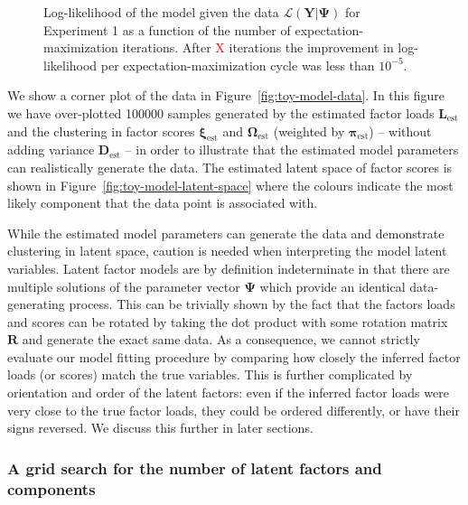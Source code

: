 \documentclass[twocolumn]{aastex61}
\newcommand{\todo}[1]{\textcolor{red}{#1}}
\newcommand{\vect}[1]{\boldsymbol{\mathbf{#1}}}
\renewcommand{\vec}[1]{\vect{#1}}
\newcommand{\weight}{\pi}
\newcommand{\data}{\textbf{Y}}
\newcommand{\factorloads}{\textbf{L}}
\newcommand{\specificvariance}{\vec{D}}
\newcommand{\scoremeans}{\vec\xi}
\newcommand{\scorecovs}{\vec\Omega}
\begin{document}
\begin{figure}
    \caption{Log-likelihood of the model given the data $\mathcal{L}\left(\vec\data|\vec\Psi\right)$ for Experiment 1 as a function of the number of expectation-maximization iterations. After \todo{X} iterations the improvement in log-likelihood per
    expectation-maximization cycle was less than $10^{-5}$.}
    \label{fig:toy-log-likelihood-per-iteration}
\end{figure}


We show a corner plot of the data in Figure~\ref{fig:toy-model-data}.
In this figure we have over-plotted 100000 samples generated by the
estimated factor loads $\factorloads_\textrm{est}$ and the clustering in factor 
scores $\scoremeans_\textrm{est}$ and $\scorecovs_\textrm{est}$ (weighted by $\vec\weight_\textrm{est}$)
-- without adding variance $\specificvariance_\textrm{est}$ %
-- in order to illustrate that the
estimated model parameters can realistically generate the data.
The estimated latent space of factor scores is shown in 
Figure~\ref{fig:toy-model-latent-space} where the colours indicate the
most likely component that the data point is associated with.

While the estimated model parameters can generate the data and demonstrate
clustering in latent space, caution is needed when interpreting the 
model latent variables.
Latent factor models are by definition indeterminate in that there are
multiple solutions of the parameter vector $\vec\Psi$ which provide
an identical data-generating process. This can be trivially shown by
the fact that the factors loads and scores can be rotated by taking the
dot product
with some rotation
matrix $\textbf{R}$ and generate the exact same data. As a consequence,
we cannot strictly evaluate our model fitting procedure by comparing
how closely the inferred factor loads (or scores) match the true 
variables. This is further complicated by orientation and order
of the latent factors: even if the inferred factor loads were very close
to the true factor loads, they could be ordered differently, or have
their signs reversed. We discuss this further in later sections.

\subsubsection{A grid search for the number of latent factors and components}
\end{document}
